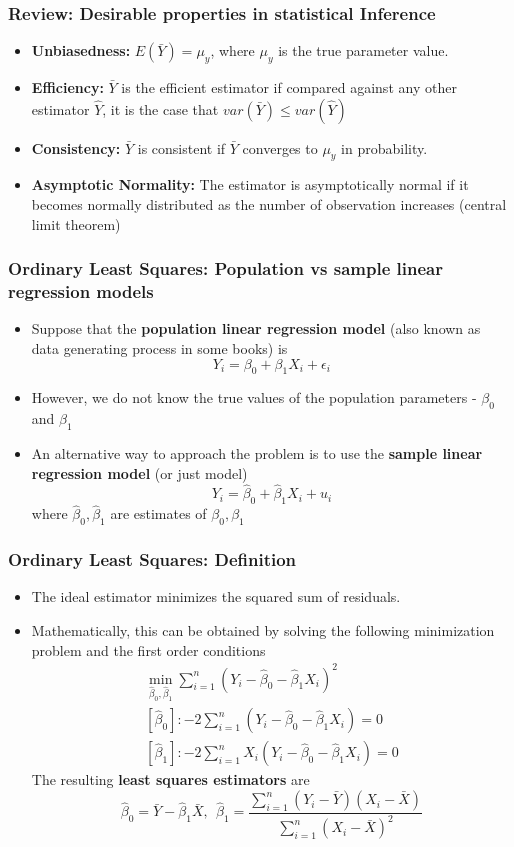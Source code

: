 \documentclass[aspectratio=169]{beamer}
\begin{document}
\begin{frame}
\frametitle{Review: Desirable properties in statistical Inference}
\begin{itemize}
\item \textbf{Unbiasedness:} $E(\bar{Y})=\mu_y$, where $\mu_y$ is the true parameter value.
\item \textbf{Efficiency:} $\bar{Y}$ is the efficient estimator if compared against any other estimator $\hat{Y}$, it is the case that $var(\bar{Y})\leq var(\hat{Y})$
\item \textbf{Consistency:} $\bar{Y}$ is consistent if $\bar{Y}$ converges to $\mu_y$ in probability.
\item \textbf{Asymptotic Normality:} The estimator is asymptotically normal if it becomes normally distributed as the number of observation increases (central limit theorem) 
\end{itemize}
\end{frame}


\begin{frame}
\frametitle{Ordinary Least Squares: Population vs sample linear regression models}
\begin{itemize}
\item Suppose that the \textbf{population linear regression model} (also known as data generating process in some books) is
\[
Y_i = \beta_0 + \beta_1X_i + \epsilon_i
\]
\item However, we do not know the true values of the population parameters - $\beta_0$ and $\beta_1$
\item An alternative way to approach the problem is to use the \textbf{sample linear regression model} (or just model)
\[
Y_i = \hat{\beta}_0 +\hat{\beta}_1X_i +u_i
\]
where $\hat{\beta}_0, \hat{\beta}_1$ are estimates of ${\beta}_0, {\beta}_1$

\end{itemize}
\end{frame}

\begin{frame}
\frametitle{Ordinary Least Squares: Definition}
\begin{itemize}
\item The ideal estimator minimizes the squared sum of residuals. 
\item Mathematically, this can be obtained by solving the following minimization problem and the first order conditions
\footnotesize{\begin{gather*}
\min_{\hat{\beta}_0, \hat{\beta}_1} \sum_{i=1}^n (Y_i-\hat{\beta}_0 - \hat{\beta}_1X_i)^2\\
[\hat{\beta}_0]: -2\sum_{i=1}^n(Y_i-\hat{\beta}_0-\hat{\beta}_1X_i)=0\\
[\hat{\beta}_1]: -2\sum_{i=1}^nX_i(Y_i-\hat{\beta}_0-\hat{\beta}_1X_i)=0 
\end{gather*}}\normalsize
The resulting \textbf{least squares estimators} are
\[
\hat{\beta}_0 = \bar{Y}-\hat{\beta}_1\bar{X}, \ \ \hat{\beta}_1=\frac{\sum_{i=1}^n(Y_i-\bar{Y})(X_i-\bar{X})}{\sum_{i=1}^n(X_i-\bar{X})^2}
\]
\end{itemize}
\end{frame}
\end{document}
